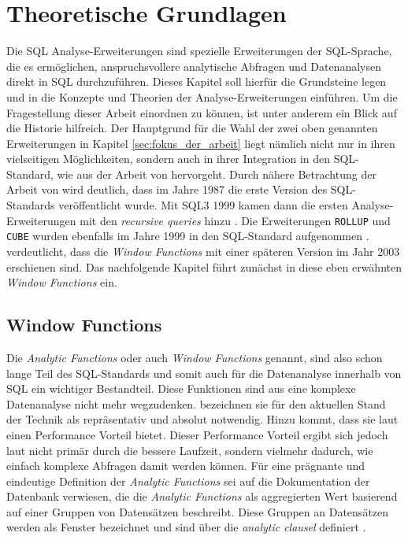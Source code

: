 \chapter{Theoretische Grundlagen}
\label{chap:hintergund_und_grundlagen} Die SQL Analyse-Erweiterungen sind spezielle
Erweiterungen der SQL-Sprache, die es ermöglichen, anspruchsvollere analytische Abfragen
und Datenanalysen direkt in SQL durchzuführen. Dieses Kapitel soll hierfür die
Grundsteine legen und in die Konzepte und Theorien der Analyse-Erweiterungen
einführen. Um die Fragestellung dieser Arbeit einordnen zu können, ist unter
anderem ein Blick auf die Historie hilfreich. Der Hauptgrund für die Wahl der zwei
oben genannten Erweiterungen in Kapitel \ref{sec:fokus_der_arbeit} liegt nämlich
nicht nur in ihren vielseitigen Möglichkeiten, sondern auch in ihrer Integration
in den SQL-Standard, wie aus der Arbeit von \citet[S.~10]{grust2017advanced}
hervorgeht. Durch nähere Betrachtung der Arbeit von \cite{grust2017advanced} wird
deutlich, dass im Jahre 1987 die erste Version des SQL-Standards veröffentlicht
wurde. Mit SQL3 1999 kamen dann die ersten Analyse-Erweiterungen mit den \textit{recursive
queries} hinzu \citep[vgl.][S.~10]{grust2017advanced}. Die Erweiterungen \texttt{ROLLUP}
und \texttt{CUBE} wurden ebenfalls im Jahre 1999 in den SQL-Standard aufgenommen
\citep[vgl.][Kapitel 9.12]{melton2001sql}. \citet[S.~10]{grust2017advanced}
verdeutlicht, dass die \textit{Window Functions} mit einer späteren Version im
Jahr 2003 erschienen sind. Das nachfolgende Kapitel führt zunächst in diese eben
erwähnten \textit{Window Functions} ein.

\section{Window Functions}
\label{sec:window_functions} Die \textit{Analytic Functions} oder auch \textit{Window
Functions} genannt, sind also schon lange Teil des SQL-Standards und somit auch für
die Datenanalyse innerhalb von SQL ein wichtiger Bestandteil. Diese Funktionen
sind aus eine komplexe Datenanalyse nicht mehr wegzudenken. \citet[S. 1244]{cao2012optimization}
bezeichnen sie für den aktuellen Stand der Technik als repräsentativ und absolut
notwendig. Hinzu kommt, dass sie laut \citet[S. 113]{kellenberger2019expert} einen
Performance Vorteil bietet. Dieser Performance Vorteil ergibt sich jedoch laut
\citet{kellenberger2019expert} nicht primär durch die bessere Laufzeit, sondern
vielmehr dadurch, wie einfach komplexe Abfragen damit werden können. Für eine
prägnante und eindeutige Definition der \textit{Analytic Functions} sei auf die Dokumentation
der \citet{oracle} Datenbank verwiesen, die die \textit{Analytic Functions} als
aggregierten Wert basierend auf einer Gruppen von Datensätzen beschreibt. Diese Gruppen
an Datensätzen werden als Fenster bezeichnet und sind über die \textit{analytic
clausel} definiert \citep[vgl.][]{oracle}.

